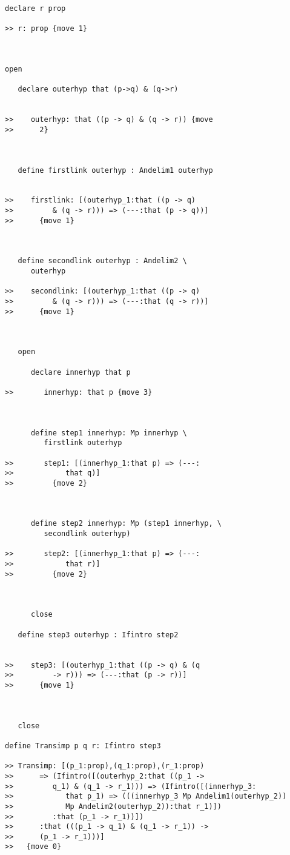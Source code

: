 \documentclass[12pt]{article}
\begin{document}
\begin{verbatim}
declare r prop

>> r: prop {move 1}



open

   declare outerhyp that (p->q) & (q->r)


>>    outerhyp: that ((p -> q) & (q -> r)) {move
>>      2}



   define firstlink outerhyp : Andelim1 outerhyp


>>    firstlink: [(outerhyp_1:that ((p -> q)
>>         & (q -> r))) => (---:that (p -> q))]
>>      {move 1}



   define secondlink outerhyp : Andelim2 \
      outerhyp

>>    secondlink: [(outerhyp_1:that ((p -> q)
>>         & (q -> r))) => (---:that (q -> r))]
>>      {move 1}



   open

      declare innerhyp that p

>>       innerhyp: that p {move 3}



      define step1 innerhyp: Mp innerhyp \
         firstlink outerhyp

>>       step1: [(innerhyp_1:that p) => (---:
>>            that q)]
>>         {move 2}



      define step2 innerhyp: Mp (step1 innerhyp, \
         secondlink outerhyp)

>>       step2: [(innerhyp_1:that p) => (---:
>>            that r)]
>>         {move 2}



      close

   define step3 outerhyp : Ifintro step2


>>    step3: [(outerhyp_1:that ((p -> q) & (q
>>         -> r))) => (---:that (p -> r))]
>>      {move 1}



   close

define Transimp p q r: Ifintro step3

>> Transimp: [(p_1:prop),(q_1:prop),(r_1:prop)
>>      => (Ifintro([(outerhyp_2:that ((p_1 ->
>>         q_1) & (q_1 -> r_1))) => (Ifintro([(innerhyp_3:
>>            that p_1) => (((innerhyp_3 Mp Andelim1(outerhyp_2))
>>            Mp Andelim2(outerhyp_2)):that r_1)])
>>         :that (p_1 -> r_1))])
>>      :that (((p_1 -> q_1) & (q_1 -> r_1)) ->
>>      (p_1 -> r_1)))]
>>   {move 0}




\end{verbatim}
\end{document}
